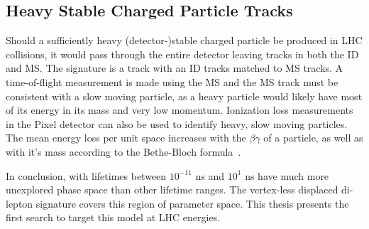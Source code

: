 \subsection{Heavy Stable Charged Particle Tracks}
\label{sec:hscp-limit}

Should a sufficiently heavy (detector-)stable charged particle be produced in \ac{LHC} collisions, it would pass through the entire detector leaving tracks in both the \ac{ID} and \ac{MS}. The signature is a track with an \ac{ID} tracks matched to \ac{MS} tracks. A time-of-flight measurement is made using the \ac{MS} and the \ac{MS} track must be consistent with a slow moving particle, as a heavy particle would likely have most of its energy in its mass and very low momentum. Ionization loss measurements in the Pixel detector can also be used to identify heavy, slow moving particles. The mean energy loss per unit space increases with the $\beta \gamma$ of a particle, as well as with it's mass according to the Bethe-Bloch formula~\cite{pdg}.


In conclusion, \slep with lifetimes between $10^{-11}$ ns and $10^{1}$ ns have much more unexplored phase space than other lifetime ranges. The vertex-less displaced di-lepton signature covers this region of parameter space. This thesis presents the first search to target this model at \ac{LHC} energies.
